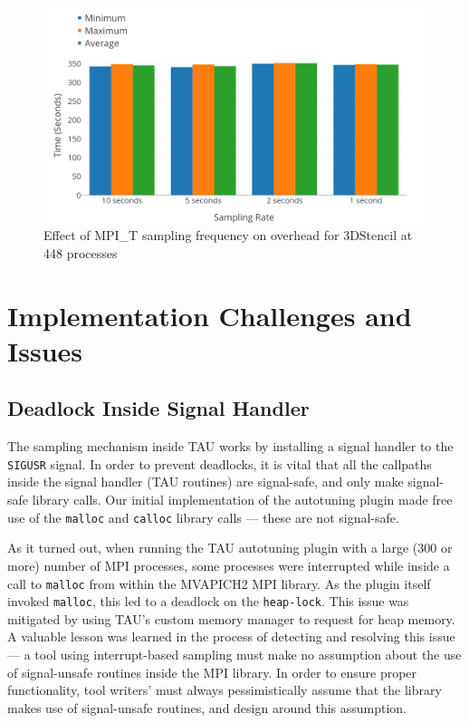\begin{center}
        \begin{figure}[tbp!]
                 \includegraphics[width=\columnwidth,keepaspectratio,scale=1.0]{figures/MPI_T_Sampling_Frequently}
                \captionsetup{justification=centering}
                  \caption{Effect of MPI\_T sampling frequency on overhead for 3DStencil at 448 processes}
                   \label{fig:sampling_frequency}
        \end{figure}
\end{center}

\section{Implementation Challenges and Issues}
\subsection{Deadlock Inside Signal Handler} 
The sampling mechanism inside TAU works by installing a signal handler to the \verb+SIGUSR+ signal. In order to prevent deadlocks, it is vital that all the callpaths inside the signal handler (TAU routines) are signal-safe, and only make signal-safe library calls. Our initial implementation of the autotuning plugin made free use of the \verb+malloc+ and \verb+calloc+ library calls --- these are not signal-safe. 
\par As it turned out, when running the TAU autotuning plugin with a large (300 or more) number of MPI processes, some processes were interrupted while inside a call to \verb+malloc+ from within the MVAPICH2 MPI library. As the plugin itself invoked \verb+malloc+, this led to a deadlock on the \verb+heap-lock+. This issue was mitigated by using TAU's custom memory manager to request for heap memory. A valuable lesson was learned in the process of detecting and resolving this issue --- a tool using interrupt-based sampling must make no assumption about the use of signal-unsafe routines inside the MPI library. In order to ensure proper functionality, tool writers' must always pessimistically assume that the library makes use of signal-unsafe routines, and design around this assumption.

